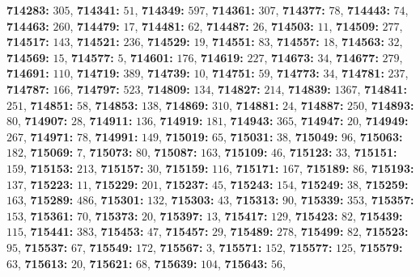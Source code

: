 \textsf{\bfseries 714283:} $305$, \textsf{\bfseries 714341:} $51$, \textsf{\bfseries 714349:} $597$, \textsf{\bfseries 714361:} $307$, \textsf{\bfseries 714377:} $78$, \textsf{\bfseries 714443:} $74$, \textsf{\bfseries 714463:} $260$, \textsf{\bfseries 714479:} $17$, \textsf{\bfseries 714481:} $62$, \textsf{\bfseries 714487:} $26$, \textsf{\bfseries 714503:} $11$, \textsf{\bfseries 714509:} $277$, \textsf{\bfseries 714517:} $143$, \textsf{\bfseries 714521:} $236$, \textsf{\bfseries 714529:} $19$, \textsf{\bfseries 714551:} $83$, \textsf{\bfseries 714557:} $18$, \textsf{\bfseries 714563:} $32$, \textsf{\bfseries 714569:} $15$, \textsf{\bfseries 714577:} $5$, \textsf{\bfseries 714601:} $176$, \textsf{\bfseries 714619:} $227$, \textsf{\bfseries 714673:} $34$, \textsf{\bfseries 714677:} $279$, \textsf{\bfseries 714691:} $110$, \textsf{\bfseries 714719:} $389$, \textsf{\bfseries 714739:} $10$, \textsf{\bfseries 714751:} $59$, \textsf{\bfseries 714773:} $34$, \textsf{\bfseries 714781:} $237$, \textsf{\bfseries 714787:} $166$, \textsf{\bfseries 714797:} $523$, \textsf{\bfseries 714809:} $134$, \textsf{\bfseries 714827:} $214$, \textsf{\bfseries 714839:} $1367$, \textsf{\bfseries 714841:} $251$, \textsf{\bfseries 714851:} $58$, \textsf{\bfseries 714853:} $138$, \textsf{\bfseries 714869:} $310$, \textsf{\bfseries 714881:} $24$, \textsf{\bfseries 714887:} $250$, \textsf{\bfseries 714893:} $80$, \textsf{\bfseries 714907:} $28$, \textsf{\bfseries 714911:} $136$, \textsf{\bfseries 714919:} $181$, \textsf{\bfseries 714943:} $365$, \textsf{\bfseries 714947:} $20$, \textsf{\bfseries 714949:} $267$, \textsf{\bfseries 714971:} $78$, \textsf{\bfseries 714991:} $149$, \textsf{\bfseries 715019:} $65$, \textsf{\bfseries 715031:} $38$, \textsf{\bfseries 715049:} $96$, \textsf{\bfseries 715063:} $182$, \textsf{\bfseries 715069:} $7$, \textsf{\bfseries 715073:} $80$, \textsf{\bfseries 715087:} $163$, \textsf{\bfseries 715109:} $46$, \textsf{\bfseries 715123:} $33$, \textsf{\bfseries 715151:} $159$, \textsf{\bfseries 715153:} $213$, \textsf{\bfseries 715157:} $30$, \textsf{\bfseries 715159:} $116$, \textsf{\bfseries 715171:} $167$, \textsf{\bfseries 715189:} $86$, \textsf{\bfseries 715193:} $137$, \textsf{\bfseries 715223:} $11$, \textsf{\bfseries 715229:} $201$, \textsf{\bfseries 715237:} $45$, \textsf{\bfseries 715243:} $154$, \textsf{\bfseries 715249:} $38$, \textsf{\bfseries 715259:} $163$, \textsf{\bfseries 715289:} $486$, \textsf{\bfseries 715301:} $132$, \textsf{\bfseries 715303:} $43$, \textsf{\bfseries 715313:} $90$, \textsf{\bfseries 715339:} $353$, \textsf{\bfseries 715357:} $153$, \textsf{\bfseries 715361:} $70$, \textsf{\bfseries 715373:} $20$, \textsf{\bfseries 715397:} $13$, \textsf{\bfseries 715417:} $129$, \textsf{\bfseries 715423:} $82$, \textsf{\bfseries 715439:} $115$, \textsf{\bfseries 715441:} $383$, \textsf{\bfseries 715453:} $47$, \textsf{\bfseries 715457:} $29$, \textsf{\bfseries 715489:} $278$, \textsf{\bfseries 715499:} $82$, \textsf{\bfseries 715523:} $95$, \textsf{\bfseries 715537:} $67$, \textsf{\bfseries 715549:} $172$, \textsf{\bfseries 715567:} $3$, \textsf{\bfseries 715571:} $152$, \textsf{\bfseries 715577:} $125$, \textsf{\bfseries 715579:} $63$, \textsf{\bfseries 715613:} $20$, \textsf{\bfseries 715621:} $68$, \textsf{\bfseries 715639:} $104$, \textsf{\bfseries 715643:} $56$, 
